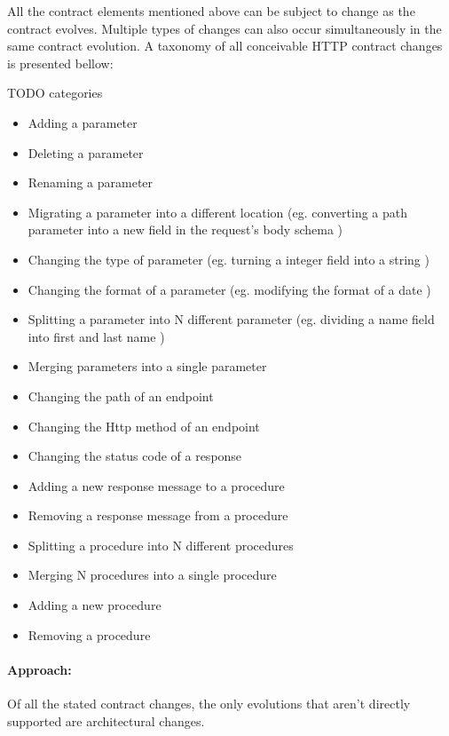 All the contract elements mentioned above can be subject to change as the contract evolves.
Multiple types of changes can also occur simultaneously in the same contract evolution.
A taxonomy of all conceivable HTTP contract changes is presented bellow:

TODO categories

\begin{itemize}
    \setlength\itemsep{0em}
    \item Adding a parameter
    \item Deleting a parameter
    \item Renaming a parameter
    \item Migrating a parameter into a different location (eg. converting a path parameter into a new field in the request's body schema )
    \item Changing the type of parameter (eg. turning a integer field into a string )
    \item Changing the format of a parameter (eg. modifying the format of a date )
    \item Splitting a parameter into N different parameter (eg. dividing a name field into first and last name )
    \item Merging parameters into a single parameter
    \item Changing the path of an endpoint
    \item Changing the Http method of an endpoint
    \item Changing the status code of a response
    \item Adding a new response message to a procedure
    \item Removing a response message from a procedure
    \item Splitting a procedure into N different procedures
    \item Merging N procedures into a single procedure
    \item Adding a new procedure
    \item Removing a procedure
\end{itemize}

\paragraph{Approach:}
Of all the stated contract changes, the only evolutions that aren't directly supported are architectural changes.

